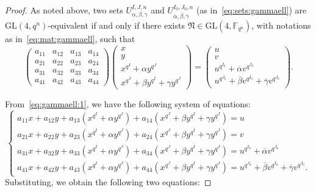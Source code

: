 \documentclass[11pt]{article}
\theoremstyle{definition}
\numberwithin{equation}{section}
\begin{document}
\begin{proof}
As noted above, two sets $U_{\alpha, \beta, \gamma}^{I,J,n}$ and $U_{\overline{\alpha}, \overline{\beta}, \overline{\gamma}}^{I_0,J_0,n}$ (as in~\eqref{eq:sets:gammaell}) are $\textrm{GL}(4,q^n)$-equivalent if and only if there exists $\mathfrak{N} \in \mathrm{GL}(4,\mathbb{F}_{q^n})$, with notations as in~\eqref{eq:mat:gammaell},
such that 
\begin{equation}
\label{eq:gammaell:1}
\begin{pmatrix}
a_{11}&a_{12}&a_{13}&a_{14}\\
a_{21}&a_{22}&a_{23}&a_{24}\\
a_{31}&a_{32}&a_{33}&a_{34}\\
a_{41}&a_{42}&a_{43}&a_{44}
\end{pmatrix}
\begin{pmatrix}
x\\
y\\
x^{q^I}+\alpha y^{q^J}\\
x^{q^J}+\beta y^{q^I} + \gamma y^{q^J}
\end{pmatrix}=
\begin{pmatrix}
u\\
v\\
u^{q^{I_0}}+\overline{\alpha} v^{q^{J_0}}\\
u^{q^{J_0}}+\overline{\beta} v^{q^{I_0}} + \overline{\gamma} v^{q^{J_0}}
\end{pmatrix}.
\end{equation}

From~\eqref{eq:gammaell:1}, we have the following system of equations:
{\small \begin{equation*}
    \begin{cases}
a_{11}x + a_{12} y  + a_{13}\left(x^{q^I}+\alpha y ^{q^J}\right) + a_{14}\left(x^{q^J}+\beta y ^{q^I}+\gamma y ^{q^J}\right)=u\\
a_{21}x + a_{22} y  + a_{23}\left(x^{q^I}+\alpha y ^{q^J}\right) + a_{24}\left(x^{q^J}+\beta y ^{q^I}+\gamma y ^{q^J}\right)=v\\
a_{31}x + a_{32} y  + a_{33}\left(x^{q^I}+\alpha y ^{q^J}\right) + a_{34}\left(x^{q^J}+\beta y ^{q^I}+\gamma y ^{q^J}\right)=u^{q^{I_0}}+\overline{\alpha} v^{q^{J_0}}\\
a_{41}x + a_{42} y  + a_{43}\left(x^{q^I}+\alpha y ^{q^J}\right) + a_{44}\left(x^{q^J}+\beta y ^{q^I}+\gamma y ^{q^J}\right)=u^{q^{J_0}}+\overline{\beta} v^{q^{I_0}} + \overline{\gamma} v^{q^{J_0}}.
    \end{cases}
\end{equation*}}
Substituting, we obtain the following two equations:


\end{proof}
\end{document}
